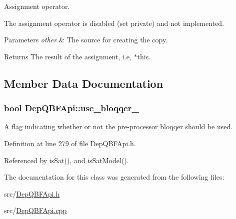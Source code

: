 Assignment operator. 

The assignment operator is disabled (set private) and not implemented.


\begin{DoxyParams}{Parameters}
{\em other} & The source for creating the copy. \\
\hline
\end{DoxyParams}
\begin{DoxyReturn}{Returns}
The result of the assignment, i.\-e, $\ast$this. 
\end{DoxyReturn}


\subsection{Member Data Documentation}
\hypertarget{classDepQBFApi_a04798225c77a19a1d2f415e50b93cfb1}{
\subsubsection[{use\-\_\-bloqqer\-\_\-}]{\setlength{\rightskip}{0pt plus 5cm}bool Dep\-Q\-B\-F\-Api\-::use\-\_\-bloqqer\-\_\-\hspace{0.3cm}{\ttfamily [protected]}}}\label{classDepQBFApi_a04798225c77a19a1d2f415e50b93cfb1}


A flag indicating whether or not the pre-\/processor bloqqer should be used. 



Definition at line 279 of file Dep\-Q\-B\-F\-Api.\-h.



Referenced by is\-Sat(), and is\-Sat\-Model().



The documentation for this class was generated from the following files\-:\begin{DoxyCompactItemize}
\item 
src/\hyperlink{DepQBFApi_8h}{Dep\-Q\-B\-F\-Api.\-h}\item 
src/\hyperlink{DepQBFApi_8cpp}{Dep\-Q\-B\-F\-Api.\-cpp}\end{DoxyCompactItemize}
